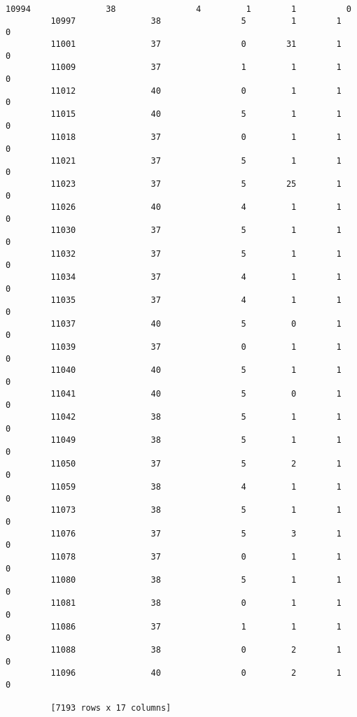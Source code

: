\documentclass[11pt]{article}
\begin{document}
\begin{Verbatim}[commandchars=\\\{\}]
         10994               38                4         1        1          0  
         10997               38                5         1        1          0  
         11001               37                0        31        1          0  
         11009               37                1         1        1          0  
         11012               40                0         1        1          0  
         11015               40                5         1        1          0  
         11018               37                0         1        1          0  
         11021               37                5         1        1          0  
         11023               37                5        25        1          0  
         11026               40                4         1        1          0  
         11030               37                5         1        1          0  
         11032               37                5         1        1          0  
         11034               37                4         1        1          0  
         11035               37                4         1        1          0  
         11037               40                5         0        1          0  
         11039               37                0         1        1          0  
         11040               40                5         1        1          0  
         11041               40                5         0        1          0  
         11042               38                5         1        1          0  
         11049               38                5         1        1          0  
         11050               37                5         2        1          0  
         11059               38                4         1        1          0  
         11073               38                5         1        1          0  
         11076               37                5         3        1          0  
         11078               37                0         1        1          0  
         11080               38                5         1        1          0  
         11081               38                0         1        1          0  
         11086               37                1         1        1          0  
         11088               38                0         2        1          0  
         11096               40                0         2        1          0  
         
         [7193 rows x 17 columns]
\end{Verbatim}
            
\end{document}
